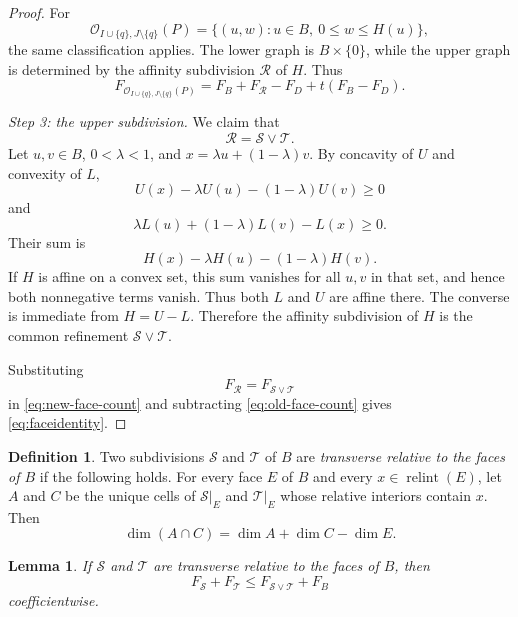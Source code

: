 \documentclass[a4paper,12pt]{amsart}
\newtheorem{lemma}[theorem]{Lemma}
\theoremstyle{definition}
\newtheorem{definition}[theorem]{Definition}
\theoremstyle{remark}
\newcommand{\OO}{\mathcal O}
\newcommand{\relint}{\operatorname{relint}}
\begin{document}
\begin{proof}
For
\[
 \OO_{I\cup\{q\},J\setminus\{q\}}(P)  =\{(u,w):u\in B,\ 0\leq w\leq H(u)\},
\]
the same classification applies. The lower graph is $B\times\{0\}$, while the upper graph is determined by the affinity subdivision $\mathcal R$ of $H$. Thus
\begin{equation}\label{eq:new-face-count}
 F_{\OO_{I\cup\{q\},J\setminus\{q\}}(P)}  =F_B+F_{\mathcal R}-F_D+t(F_B-F_D).
\end{equation}

\smallskip
\noindent\emph{Step 3: the upper subdivision.}
We claim that
\[
 \mathcal R=\mathcal S\vee\mathcal T.
\]
Let $u,v\in B$, $0<\lambda<1$, and $x=\lambda u+(1-\lambda)v$. 
By concavity of $U$ and convexity of $L$,
\[
 U(x)-\lambda U(u)-(1-\lambda)U(v)\geq0
\]
and
\[
 \lambda L(u)+(1-\lambda)L(v)-L(x)\geq0.
\]
Their sum is
\[
 H(x)-\lambda H(u)-(1-\lambda)H(v).
\]
If $H$ is affine on a convex set, this sum vanishes for all $u,v$ in that set, and hence both nonnegative terms vanish. 
Thus both $L$ and $U$ are affine there. 
The converse is immediate from $H=U-L$. 
Therefore the affinity subdivision of $H$ is the common refinement $\mathcal S\vee\mathcal T$.

Substituting
\[
 F_{\mathcal R}=F_{\mathcal S\vee\mathcal T}
\]
in \eqref{eq:new-face-count} and subtracting \eqref{eq:old-face-count} gives \eqref{eq:faceidentity}.
\end{proof}


\begin{definition}\label{def:relative-transverse}
Two subdivisions $\mathcal S$ and $\mathcal T$ of $B$ are \emph{transverse relative to the faces of $B$} if the following holds. 
For every face $E$ of $B$ and every $x\in\relint(E)$, let $A$ and $C$ be the unique cells of $\mathcal S|_E$ and $\mathcal T|_E$ whose relative interiors contain $x$. 
Then
\begin{equation}\label{eq:transverse}
 \dim(A\cap C)=\dim A+\dim C-\dim E.
\end{equation}
\end{definition}


\begin{lemma}\label{lem:subdivision}
If $\mathcal S$ and $\mathcal T$ are transverse relative to the faces of $B$, then
\begin{equation}\label{eq:subdivision-inequality}
 F_{\mathcal S}+F_{\mathcal T}\leq F_{\mathcal S\vee\mathcal T}+F_B
\end{equation}
coefficientwise.
\end{lemma}
\end{document}
